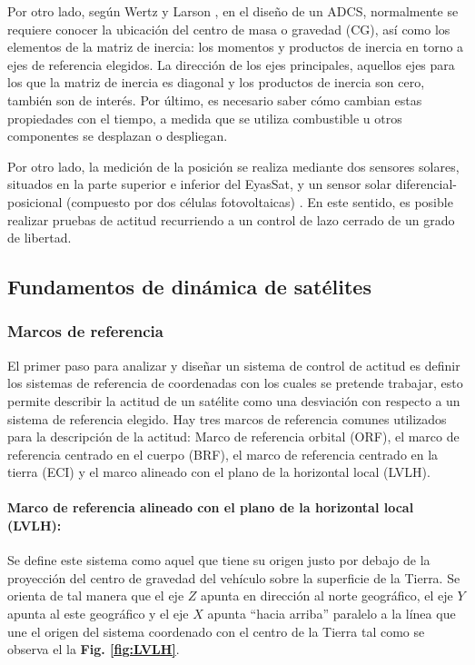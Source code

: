 Por otro lado, según Wertz y Larson \cite{Wertz1999} , en el diseño de un ADCS, normalmente se requiere conocer la ubicación del centro de masa o gravedad (CG), así como los elementos de la matriz de inercia: los momentos y productos de inercia en torno a ejes de referencia elegidos. La dirección de los ejes principales, aquellos ejes para los que la matriz de inercia es diagonal y los productos de inercia son cero, también son de interés. Por último, es necesario saber cómo cambian estas propiedades con el tiempo, a medida que se utiliza combustible u otros componentes se desplazan o despliegan.

Por otro lado, la medición de la posición se realiza mediante dos sensores solares, situados en la parte superior e inferior del EyasSat, y un sensor solar diferencial-posicional (compuesto por dos células fotovoltaicas) \cite{Ritchey2004}. En este sentido, es posible realizar pruebas de actitud recurriendo a un control de lazo cerrado de un grado de libertad. 

\subsection{Fundamentos de dinámica de satélites}

\subsubsection{Marcos de referencia}
\hfill \break
El primer paso para analizar y diseñar un sistema de control de actitud es definir los sistemas de referencia de coordenadas con los cuales se pretende trabajar, esto  permite describir la actitud de un satélite como una desviación con respecto a un sistema de referencia elegido. Hay tres marcos de referencia comunes utilizados para la descripción de la actitud: Marco de referencia orbital (ORF), el marco de referencia centrado en el cuerpo (BRF), el marco de referencia centrado en la tierra (ECI) y el marco alineado con el plano de la horizontal local (LVLH). 

\paragraph{Marco de referencia alineado con el plano de la horizontal local (LVLH):} Se define este sistema como aquel que tiene su origen justo por debajo de la proyección del centro de gravedad del vehículo sobre la superficie de la Tierra. Se orienta de tal manera que el eje $Z$ apunta en dirección al norte
geográfico, el eje $Y$ apunta al este geográfico y el eje $X$ apunta “hacia arriba”
paralelo a la línea que une el origen del sistema coordenado con el centro de la
Tierra tal como se observa el la \textbf{Fig. \ref{fig:LVLH}}.


